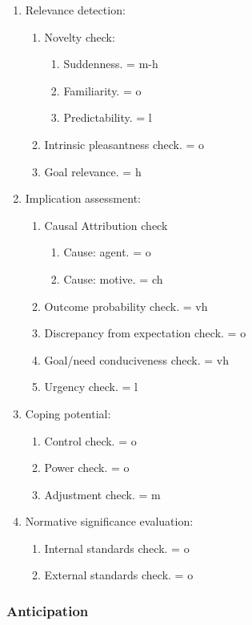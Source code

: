 \begin{enumerate}
 \item  Relevance detection:
 \begin{enumerate}
  \item  Novelty check:
  \begin{enumerate}
   \item  Suddenness. = m-h
   \item  Familiarity. = o
   \item  Predictability. = l
  \end{enumerate}
  \item  Intrinsic pleasantness check. = o
  \item  Goal relevance. = h
 \end{enumerate}
 \item  Implication assessment:
 \begin{enumerate}
  \item  Causal Attribution check
  \begin{enumerate}
   \item  Cause: agent. = o
   \item  Cause: motive. = ch
  \end{enumerate}
  \item  Outcome probability check. = vh
  \item  Discrepancy from expectation check. = o
  \item  Goal/need conduciveness check. = vh
  \item  Urgency check. = l
 \end{enumerate}
 \item  Coping potential:
 \begin{enumerate}
  \item  Control check. = o
  \item  Power check. = o
  \item  Adjustment check. = m
 \end{enumerate}
 \item  Normative significance evaluation:
 \begin{enumerate}
  \item  Internal standards check. = o
  \item  External standards check. = o
 \end{enumerate}
\end{enumerate}

\subsubsection{Anticipation}


